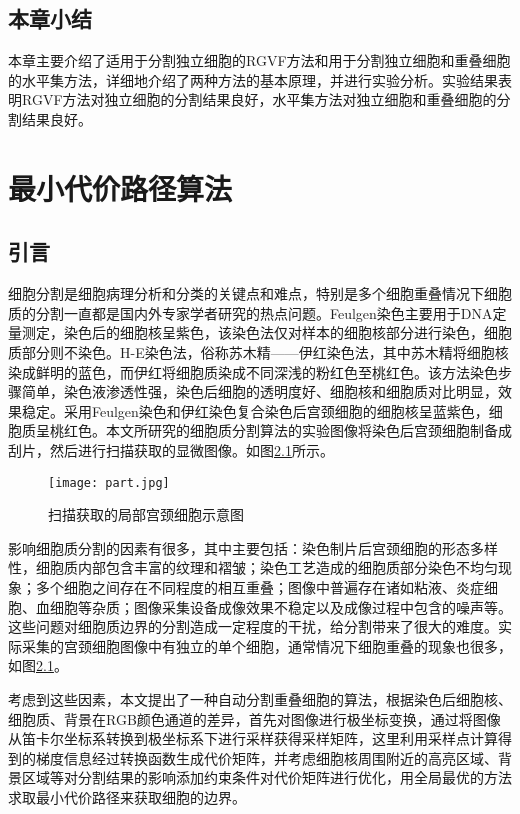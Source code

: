 \documentclass[nomlist,masters]{seuthesix}
\begin{document}
\section{本章小结}
本章主要介绍了适用于分割独立细胞的RGVF方法和用于分割独立细胞和重叠细胞的水平集方法，详细地介绍了两种方法的基本原理，并进行实验分析。实验结果表明RGVF方法对独立细胞的分割结果良好，水平集方法对独立细胞和重叠细胞的分割结果良好。

\chapter{最小代价路径算法}  
\section{引言}     
细胞分割是细胞病理分析和分类的关键点和难点，特别是多个细胞重叠情况下细胞质的分割一直都是国内外专家学者研究的热点问题。Feulgen染色主要用于DNA定量测定，染色后的细胞核呈紫色，该染色法仅对样本的细胞核部分进行染色，细胞质部分则不染色。H-E染色法，俗称苏木精——伊红染色法，其中苏木精将细胞核染成鲜明的蓝色，而伊红将细胞质染成不同深浅的粉红色至桃红色。该方法染色步骤简单，染色液渗透性强，染色后细胞的透明度好、细胞核和细胞质对比明显，效果稳定。采用Feulgen染色和伊红染色复合染色后宫颈细胞的细胞核呈蓝紫色，细胞质呈桃红色。本文所研究的细胞质分割算法的实验图像将染色后宫颈细胞制备成刮片，然后进行扫描获取的显微图像。如图\ref{part}所示。

\begin{figure}[H]
\centering
\texttt{[image: part.jpg]}
\caption{扫描获取的局部宫颈细胞示意图\label{part}}
\end{figure}

影响细胞质分割的因素有很多，其中主要包括：染色制片后宫颈细胞的形态多样性，细胞质内部包含丰富的纹理和褶皱；染色工艺造成的细胞质部分染色不均匀现象；多个细胞之间存在不同程度的相互重叠；图像中普遍存在诸如粘液、炎症细胞、血细胞等杂质；图像采集设备成像效果不稳定以及成像过程中包含的噪声等。这些问题对细胞质边界的分割造成一定程度的干扰，给分割带来了很大的难度。实际采集的宫颈细胞图像中有独立的单个细胞，通常情况下细胞重叠的现象也很多，如图\ref{part}。

考虑到这些因素，本文提出了一种自动分割重叠细胞的算法，根据染色后细胞核、细胞质、背景在RGB颜色通道的差异，首先对图像进行极坐标变换，通过将图像从笛卡尔坐标系转换到极坐标系下进行采样获得采样矩阵，这里利用采样点计算得到的梯度信息经过转换函数生成代价矩阵，并考虑细胞核周围附近的高亮区域、背景区域等对分割结果的影响添加约束条件对代价矩阵进行优化，用全局最优的方法求取最小代价路径来获取细胞的边界。
\end{document}
